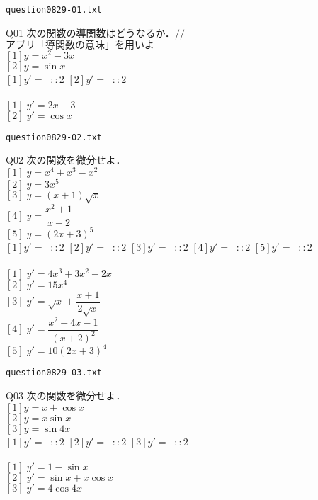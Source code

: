 \documentclass[10pt,dvipdfmx]{jarticle}
\begin{document}
\begin{center}
\verb|question0829-01.txt|\\
\end{center}
Q01 
$\text{次の関数の導関数はどうなるか．}//$\\
$\text{アプリ「導関数の意味」を用いよ}$\\
$[1]y=x^2-3x$\\
$[2]y=\sin x $\\
$[1]y'=\;\;::2$ 
$[2]y'=\;\;::2$ 
\\
\\
$[1]\;y'=2x-3$\\
$[2]\;y'=\cos x $\\
\newpage
\begin{center}
\verb|question0829-02.txt|\\
\end{center}
Q02 
$\text{次の関数を微分せよ．}$\\
$[1]\;y=x^4+x^3-x^2$\\
$[2]\;y=3x^5$\\
$[3]\;y=(x+1)\sqrt{x}$\\
$[4]\;y=\dfrac{x^2+1}{x+2}$\\
$[5]\;y=(2x+3)^5$\\
$[1]y'=\;\;::2$ 
$[2]y'=\;\;::2$ 
$[3]y'=\;\;::2$ 
$[4]y'=\;\;::2$ 
$[5]y'=\;\;::2$ 
\\
\\
$[1]\;y'=4x^3+3x^2-2x$\\
$[2]\;y'=15x^4$\\
$[3]\;y'=\sqrt{x}+\dfrac{x+1}{2\sqrt{x}}$\\
$[4]\;y'=\dfrac{x^2+4x-1}{(x+2)^2}$\\
$[5]\;y'=10(2x+3)^4$\\
\newpage
\begin{center}
\verb|question0829-03.txt|\\
\end{center}
Q03 
$\text{次の関数を微分せよ．}$\\
$[1]y=x+\cos x $\\
$[2]y=x\sin x $\\
$[3]y=\sin 4x $\\
$[1]y'=\;\;::2$ 
$[2]y'=\;\;::2$ 
$[3]y'=\;\;::2$ 
\\
\\
$[1]\;y'=1-\sin x $\\
$[2]\;y'=\sin x +x\cos x $\\
$[3]\;y'=4\cos 4x $\\
\end{document}
